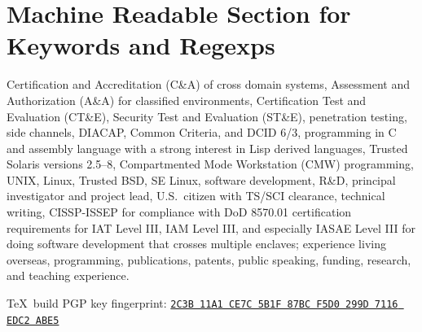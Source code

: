 \documentclass[12pt,twoside,letterpaper]{article}
\begin{document}
\vspace{-8mm}
\section*{Machine Readable Section for Keywords and Regexps}
\vspace{-2mm}

Certification and Accreditation (C\&A) of cross domain systems,
Assessment and Authorization (A\&A) for classified environments,
Certification Test and Evaluation (CT\&E), Security Test and Evaluation (ST\&E),
penetration testing, side channels,
DIACAP, Common Criteria, and DCID 6/3,
programming in C and assembly language with a strong interest in Lisp derived languages,
Trusted Solaris versions 2.5--8, Compartmented Mode Workstation (CMW) programming,
UNIX, Linux, Trusted BSD, SE Linux,
software development,
R\&D,
principal investigator and project lead,
U.S.\ citizen with TS/SCI clearance,
technical writing,
CISSP-ISSEP for compliance with DoD 8570.01 certification requirements
	for IAT Level III, IAM Level III, and especially IASAE Level III
	for doing software development that crosses multiple enclaves;
experience living overseas,
programming,
publications,
patents,
public speaking,
funding,
research,
and teaching experience.

\vfill
{\noindent\tiny \TeX\ build }
\hfill
PGP key fingerprint:
\href{http://call-with-current-continuation.com/Joe.Loughry.txt}%
{\texttt{2C3B 11A1 CE7C 5B1F 87BC  F5D0 299D 7116 EDC2 ABE5}}
\end{document}
